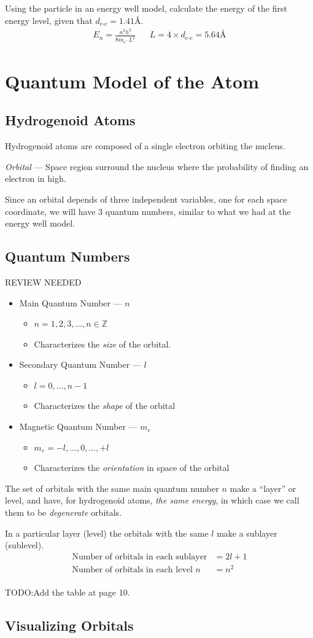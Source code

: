\documentclass{article}[10pt]
\begin{document}
Using the particle in an energy well model, calculate the energy of the first energy
level, given that $d_{\text{c-c}}=1.41\si{\angstrom}$.
\begin{align*}
	E_n = \frac{n^2h^2}{8m_{e^{-}}L^2} &   & L=4\times d_{\text{c-c}}=5.64\si{\angstrom}
\end{align*}
\section{Quantum Model of the Atom}
\subsection{Hydrogenoid Atoms}
Hydrogenoid atoms are composed of a single electron orbiting the nucleus.

\emph{Orbital} --- Space region surround the nucleus where the probability of
finding an electron in high.

Since an orbital depends of three independent variables, one for each space
coordinate, we will have 3 quantum numbers, similar to what we had at the energy
well model.
\subsection{Quantum Numbers}
REVIEW NEEDED
\begin{itemize}
	\item Main Quantum Number --- $n$
	      \begin{itemize}
	      	\item $n=1,2,3,\ldots,n\in\mathbb Z$
	      	\item Characterizes the \emph{size} of the orbital.
	      \end{itemize}
	\item Secondary Quantum Number --- $l$
	      \begin{itemize}
	      	\item $l=0,\ldots,n-1$\\
	      	\item Characterizes the \emph{shape} of the orbital
	      \end{itemize}
	\item Magnetic Quantum Number --- $m_e$
	      \begin{itemize}
	      	\item $m_e = -l,\ldots,0,\ldots,+l$
	      	\item Characterizes the \emph{orientation} in space of the orbital
	      \end{itemize}
\end{itemize}
The set of orbitals with the same main quantum number $n$ make a ``layer'' or
level, and have, for hydrogenoid atoms, \emph{the same energy}, in which case
we call them to be \emph{degenerate} orbitals.

In a particular layer (level) the orbitals with the same $l$ make a sublayer (sublevel).
\begin{align*}
	\text{Number of orbitals in each sublayer}  &= 2l+1\\
	\text{Number of orbitals in each level $n$} &= n^2 \\
\end{align*}

TODO:\@ Add the table at page 10.

\subsection{Visualizing Orbitals}
\end{document}
